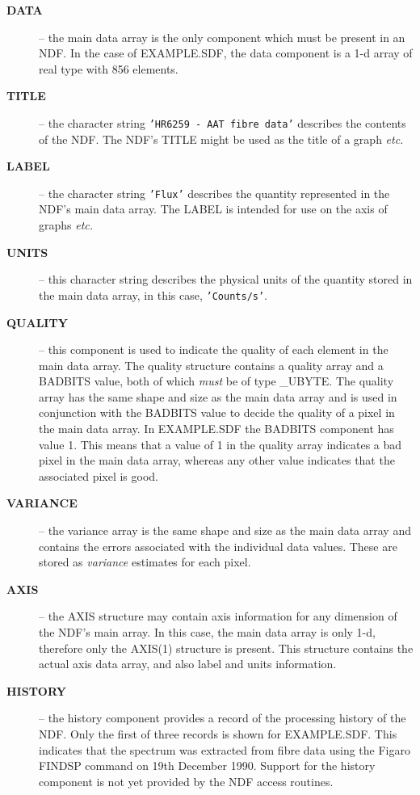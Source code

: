\documentclass[twoside,11pt,nolof]{starlink}
\begin{document}
\begin{description}

\item[\textbf{DATA}] -- the main data array is the only
component which must be present in an NDF.
In the case of EXAMPLE.SDF, the data component is a 1-d
array of real type with 856 elements.

\item[\textbf{TITLE}] -- the  character string {\tt'HR6259 - AAT fibre
data'} describes the contents of the NDF. The NDF's TITLE
might be used as the title of a graph \textit{etc.}

\item[\textbf{LABEL}] -- the character string {\tt'Flux'} describes the
quantity represented in the NDF's main data array. The LABEL is
intended for use on the axis of graphs \textit{etc.}

\item[\textbf{UNITS}] -- this character string
describes the physical units of the quantity stored in the main data
array, in this case, {\tt'Counts/s'}.

\item[\textbf{QUALITY}] -- this component is used to indicate
the quality of each element in the main data array.
The quality structure contains a
quality array and a BADBITS value, both of which {\sl must\/} be of
type \_UBYTE.
The quality array has the same shape and size as
the main data array and is used in conjunction with the BADBITS value
to decide the quality of a pixel in the main data array.
In EXAMPLE.SDF the BADBITS component has value 1.
This means that a value of 1 in the quality array indicates a bad pixel
in the main data array, whereas any other value indicates that
the associated pixel is good.

\item[\textbf{VARIANCE}] -- the variance array is the same shape and size
as the main data array and contains the errors
associated with the individual data values.
These are stored as {\sl variance\/} estimates for each
pixel.

\item[\textbf{AXIS}] -- the AXIS structure may contain axis information
for any dimension of the NDF's main array.
In this case, the main data array is only 1-d, therefore only the
AXIS(1) structure is present.
This structure contains the actual axis data array, and also
label and units information.

\item[\textbf{HISTORY}] -- the history component provides a record of
the processing history of the NDF.
Only the first of three records is shown for EXAMPLE.SDF. This indicates
that the spectrum was extracted from fibre data using the Figaro FINDSP
command on 19th December 1990.
Support for the history component is not yet provided by the NDF access
routines.



\end{description}
\end{document}
